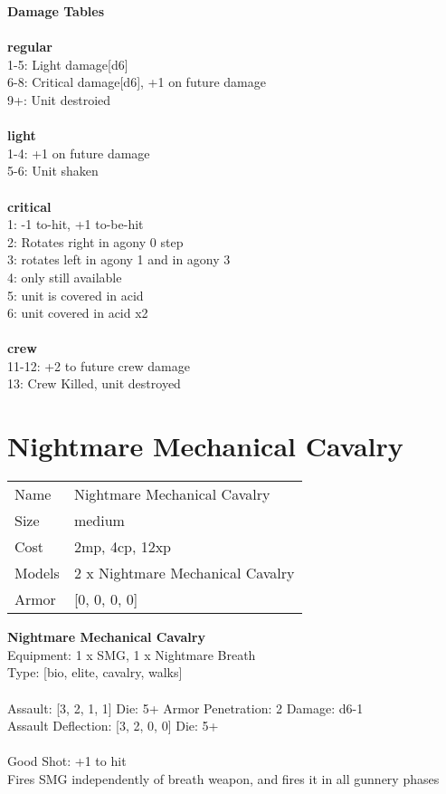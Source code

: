 {\bf Damage Tables} \\
\ \\ {\bf regular } \\
1-5: Light damage[d6] \\
6-8: Critical damage[d6], +1 on future damage \\
9+: Unit destroied \\
\ \\ {\bf light } \\
1-4: +1 on future damage \\
5-6: Unit shaken \\
\ \\ {\bf critical } \\
1: -1 to-hit, +1 to-be-hit \\
2: Rotates right in agony 0 step \\
3: rotates left in agony 1 and in agony 3 \\
4: only still available \\
5: unit is covered in acid \\
6: unit covered in acid x2 \\
\ \\ {\bf crew } \\
11-12: +2 to future crew damage \\
13: Crew Killed, unit destroyed \\










\pagebreak\pagebreak

\section{ Nightmare Mechanical Cavalry }

\begin{tabular}{ll}
  Name & Nightmare Mechanical Cavalry \\
  Size & medium\\
  Cost & 2mp, 4cp, 12xp\\
  Models & 2 x Nightmare Mechanical Cavalry\\
  Armor & [0, 0, 0, 0]\\
\end{tabular}

\noindent 

{\bf Nightmare Mechanical Cavalry } \\
Equipment: 1 x SMG, 1 x Nightmare Breath \\
Type: [bio, elite, cavalry, walks] \\
\ \\
Assault: [3, 2, 1, 1] Die: 5+ Armor Penetration: 2 Damage: d6-1 \\
Assault Deflection: [3, 2, 0, 0] Die: 5+\\
\indent  
\ \\
Good Shot: +1 to hit\\ 
Fires SMG independently of breath weapon, and fires it in all gunnery phases\\ 


